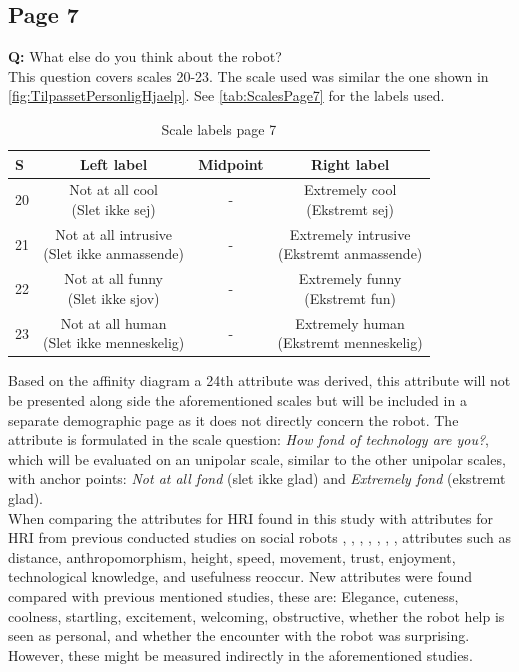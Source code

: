 \subsection{Page 7}
\noindent
\textbf{Q:} What else do you think about the robot?\\%
This question covers scales 20-23. The scale used was similar the one shown in \autoref{fig:TilpassetPersonligHjaelp}. See \autoref{tab:ScalesPage7} for the labels used.
%
\begin{table}[H]
	\centering
\caption{Scale labels page 7}
	\label{tab:ScalesPage7} 
	\begin{tabular}{l|c|c|c}
		S    & Left label & Midpoint & Right label \\\hline
		20   & \makecell{Not at all cool\\(Slet ikke sej)}  & - & \makecell{Extremely cool \\(Ekstremt sej)}        \\\hline
		21   & \makecell{Not at all intrusive \\(Slet ikke anmassende)} & - & \makecell{Extremely intrusive \\(Ekstremt anmassende)}         \\\hline
		22   & \makecell{Not at all funny\\(Slet ikke sjov)} & - & \makecell{Extremely funny \\(Ekstremt fun)}         \\\hline
	 	23   & \makecell{Not at all human \\(Slet ikke menneskelig)} & - & \makecell{Extremely human \\(Ekstremt menneskelig)}               
	\end{tabular}        
\end{table}
\noindent
%
Based on the affinity diagram a 24th attribute was derived, this attribute will not be presented along side the aforementioned scales but will be included in a separate demographic page as it does not directly concern the robot. The attribute is formulated in the scale question: \textit{How fond of technology are you?}, which will be evaluated on an unipolar scale, similar to the other unipolar scales, with anchor points: \textit{Not at all fond} (slet ikke glad) and \textit{Extremely fond} (ekstremt glad).\\  

\noindent
When comparing the attributes for HRI found in this study with attributes for HRI from previous conducted studies on social robots \cite{PDF:ExploringInfluencingVariable}, \cite{PDF:SharingALifeHarvey}, \cite{PDF:InTheCompanyofRobots}, \cite{PDF:CloseButNotStuck}, \cite{PDF:TheImpactOfTraveler}, \cite{PDF:HumanRobotEmodiedInteraction}, \cite{PDF:RecommendationEffects}, attributes such as distance, anthropomorphism, height, speed, movement, trust, enjoyment, technological knowledge, and usefulness reoccur. New attributes were found compared with previous mentioned studies, these are: Elegance, cuteness, coolness, startling, excitement, welcoming, obstructive, whether the robot help is seen as personal, and whether the encounter with the robot was surprising. However, these might be measured indirectly in the aforementioned studies.

